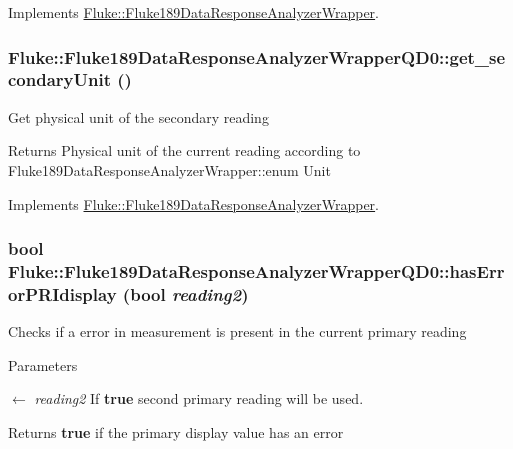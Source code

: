 Implements \hyperlink{classFluke_1_1Fluke189DataResponseAnalyzerWrapper_a21a39a54587e31af04c931b46aa11806}{Fluke::Fluke189DataResponseAnalyzerWrapper}.\hypertarget{classFluke_1_1Fluke189DataResponseAnalyzerWrapperQD0_a3f1bdb92d10f341c8b22fa8ee95600b5}{
\subsubsection[{get\_\-secondaryUnit}]{ Fluke::Fluke189DataResponseAnalyzerWrapperQD0::get\_\-secondaryUnit ()}}
\label{classFluke_1_1Fluke189DataResponseAnalyzerWrapperQD0_a3f1bdb92d10f341c8b22fa8ee95600b5}
Get physical unit of the secondary reading \begin{DoxyReturn}{Returns}
Physical unit of the current reading according to Fluke189DataResponseAnalyzerWrapper::enum Unit 
\end{DoxyReturn}


Implements \hyperlink{classFluke_1_1Fluke189DataResponseAnalyzerWrapper_a8c24a1f3d5abae862ffa06a3a7ac44f1}{Fluke::Fluke189DataResponseAnalyzerWrapper}.\hypertarget{classFluke_1_1Fluke189DataResponseAnalyzerWrapperQD0_aeffd54445d733f8b149c5918589e5b9e}{
\subsubsection[{hasErrorPRIdisplay}]{\setlength{\rightskip}{0pt plus 5cm}bool Fluke::Fluke189DataResponseAnalyzerWrapperQD0::hasErrorPRIdisplay (bool {\em reading2})}}
\label{classFluke_1_1Fluke189DataResponseAnalyzerWrapperQD0_aeffd54445d733f8b149c5918589e5b9e}
Checks if a error in measurement is present in the current primary reading 
\begin{DoxyParams}{Parameters}
\item[\mbox{$\leftarrow$} {\em reading2}]If {\bfseries true} second primary reading will be used. \end{DoxyParams}
\begin{DoxyReturn}{Returns}
{\bfseries true} if the primary display value has an error 
\end{DoxyReturn}


